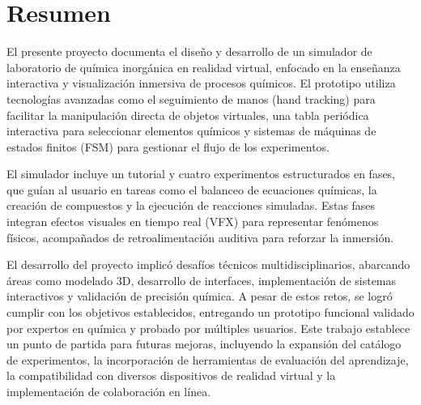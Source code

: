 \chapter{Resumen}
El presente proyecto documenta el diseño y desarrollo de un simulador de laboratorio de química inorgánica en realidad virtual, enfocado en la enseñanza interactiva y visualización inmersiva de procesos químicos. El prototipo utiliza tecnologías avanzadas como el seguimiento de manos (hand tracking) para facilitar la manipulación directa de objetos virtuales, una tabla periódica interactiva para seleccionar elementos químicos y sistemas de máquinas de estados finitos (FSM) para gestionar el flujo de los experimentos.

El simulador incluye un tutorial y cuatro experimentos estructurados en fases, que guían al usuario en tareas como el balanceo de ecuaciones químicas, la creación de compuestos y la ejecución de reacciones simuladas. Estas fases integran efectos visuales en tiempo real (VFX) para representar fenómenos físicos, acompañados de retroalimentación auditiva para reforzar la inmersión.

El desarrollo del proyecto implicó desafíos técnicos multidisciplinarios, abarcando áreas como modelado 3D, desarrollo de interfaces, implementación de sistemas interactivos y validación de precisión química. A pesar de estos retos, se logró cumplir con los objetivos establecidos, entregando un prototipo funcional validado por expertos en química y probado por múltiples usuarios. Este trabajo establece un punto de partida para futuras mejoras, incluyendo la expansión del catálogo de experimentos, la incorporación de herramientas de evaluación del aprendizaje, la compatibilidad con diversos dispositivos de realidad virtual y la implementación de colaboración en línea.